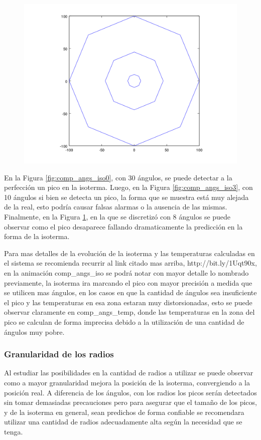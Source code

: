 \begin{figure}[H]
\begin{minipage}{0.30\textwidth}
  \centering
    \includegraphics[width=1\textwidth]{imgs/comp_angulos/comp_angs_iso4.png} 
  \caption{}
  \label{fig:comp_angs_iso4}
\end{minipage}

\end{figure}

En la Figura \ref{fig:comp_angs_iso0}, con 30 ángulos, se puede detectar a la perfección un pico en la isoterma. Luego, en la Figura \ref{fig:comp_angs_iso3}, con 10 ángulos si bien se detecta un pico, la forma que se muestra está muy alejada de la real, esto podría causar falsas alarmas o la ausencia de las mismas.
Finalmente, en la Figura \ref{fig:comp_angs_iso4}, en la que se discretizó con 8 ángulos se puede observar como el pico desaparece fallando dramaticamente la predicción en la forma de la isoterma.

Para mas detalles de la evolución de la isoterma y las temperaturas calculadas en el sistema se recomienda recurrir al link citado mas arriba, http://bit.ly/1Uqt90x, en la animación comp_angs_iso se podrá notar con mayor detalle lo nombrado previamente, la isoterma ira marcando el pico con mayor precisión a medida que se utilicen mas ángulos, en los casos en que la cantidad de ángulos sea insuficiente el pico y las temperaturas en esa zona estaran muy distorsionadas, esto se puede observar claramente en comp_angs_temp, donde las temperaturas en la zona del pico se calculan de forma imprecisa debido a la utilización de una cantidad de ángulos muy pobre.


\subsubsection{Granularidad de los radios}
Al estudiar las posibilidades en la cantidad de radios a utilizar se puede observar como a mayor granularidad mejora la posición de la isoterma, convergiendo a la posición real. A diferencia de los ángulos, con los radios los picos serán detectados sin tomar demasiadas precauciones pero para asegurar que el tamaño de los picos, y de la isoterma en general, sean predichos de forma confiable se recomendara utilizar una cantidad de radios adecuadamente alta según la necesidad que se tenga.

